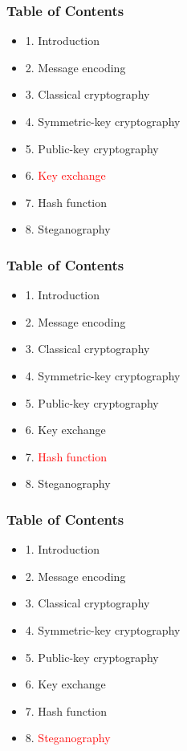 \documentclass[handout, xcolor=dvipsnames,aspectratio=169]{beamer}
\begin{document}

\begin{frame}
  \centering
  \frametitle{Table of Contents}
  \begin{itemize}
    \item 1. Introduction
    \item 2. Message encoding
    \item 3. Classical cryptography
    \item 4. Symmetric-key cryptography
    \item 5. Public-key cryptography
    \item 6. \textcolor{red}{Key exchange}
    \item 7. Hash function
    \item 8. Steganography
  \end{itemize}  
\end{frame}

\begin{frame}
  \centering
  \frametitle{Table of Contents}
  \begin{itemize}
    \item 1. Introduction
    \item 2. Message encoding
    \item 3. Classical cryptography
    \item 4. Symmetric-key cryptography
    \item 5. Public-key cryptography
    \item 6. Key exchange
    \item 7. \textcolor{red}{Hash function}
    \item 8. Steganography
  \end{itemize}  
\end{frame}

\begin{frame}
  \centering
  \frametitle{Table of Contents}
  \begin{itemize}
    \item 1. Introduction
    \item 2. Message encoding
    \item 3. Classical cryptography
    \item 4. Symmetric-key cryptography
    \item 5. Public-key cryptography
    \item 6. Key exchange
    \item 7. Hash function
    \item 8. \textcolor{red}{Steganography}
  \end{itemize}  
\end{frame}

\end{document}
